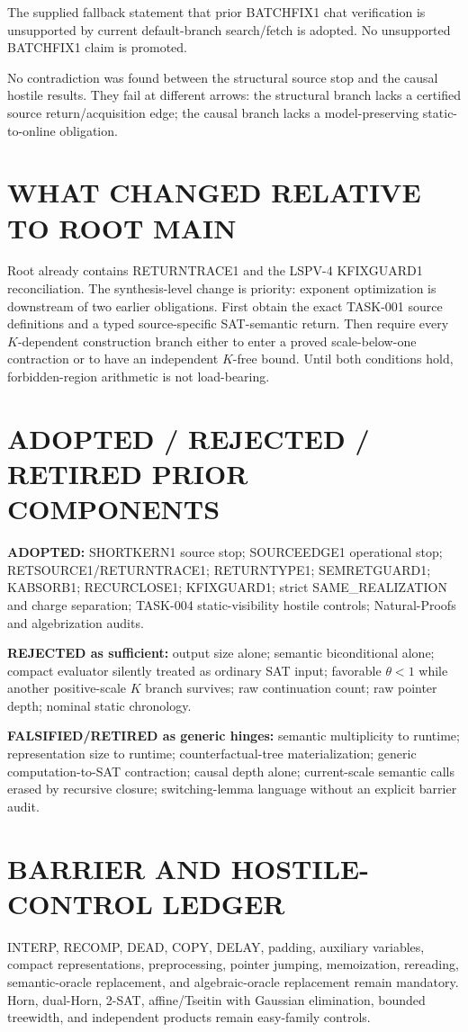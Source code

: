 \documentclass[11pt]{article}
\begin{document}
The supplied fallback statement that prior BATCHFIX1 chat verification is unsupported by current default-branch search/fetch is adopted. No unsupported BATCHFIX1 claim is promoted.

No contradiction was found between the structural source stop and the causal hostile results. They fail at different arrows: the structural branch lacks a certified source return/acquisition edge; the causal branch lacks a model-preserving static-to-online obligation.

\section*{WHAT CHANGED RELATIVE TO ROOT MAIN}
Root already contains RETURNTRACE1 and the LSPV-4 KFIXGUARD1 reconciliation. The synthesis-level change is priority: exponent optimization is downstream of two earlier obligations. First obtain the exact TASK-001 source definitions and a typed source-specific SAT-semantic return. Then require every \(K\)-dependent construction branch either to enter a proved scale-below-one contraction or to have an independent \(K\)-free bound. Until both conditions hold, forbidden-region arithmetic is not load-bearing.

\section*{ADOPTED / REJECTED / RETIRED PRIOR COMPONENTS}
\textbf{ADOPTED:} SHORTKERN1 source stop; SOURCEEDGE1 operational stop; RETSOURCE1/RETURNTRACE1; RETURNTYPE1; SEMRETGUARD1; KABSORB1; RECURCLOSE1; KFIXGUARD1; strict SAME\_REALIZATION and charge separation; TASK-004 static-visibility hostile controls; Natural-Proofs and algebrization audits.

\textbf{REJECTED as sufficient:} output size alone; semantic biconditional alone; compact evaluator silently treated as ordinary SAT input; favorable \(\theta<1\) while another positive-scale \(K\) branch survives; raw continuation count; raw pointer depth; nominal static chronology.

\textbf{FALSIFIED/RETIRED as generic hinges:} semantic multiplicity to runtime; representation size to runtime; counterfactual-tree materialization; generic computation-to-SAT contraction; causal depth alone; current-scale semantic calls erased by recursive closure; switching-lemma language without an explicit barrier audit.

\section*{BARRIER AND HOSTILE-CONTROL LEDGER}
INTERP, RECOMP, DEAD, COPY, DELAY, padding, auxiliary variables, compact representations, preprocessing, pointer jumping, memoization, rereading, semantic-oracle replacement, and algebraic-oracle replacement remain mandatory. Horn, dual-Horn, 2-SAT, affine/Tseitin with Gaussian elimination, bounded treewidth, and independent products remain easy-family controls.
\end{document}
